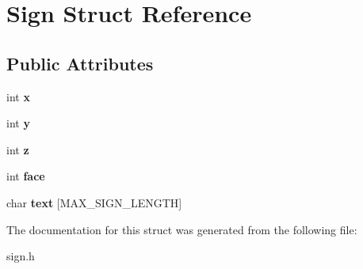 \hypertarget{structSign}{}\section{Sign Struct Reference}
\label{structSign}
\subsection*{Public Attributes}
\begin{DoxyCompactItemize}
\item 
\mbox{\label{structSign_a9672fe58fa3a1d75c9511fe8259eb4e6}} 
int {\bfseries x}
\item 
\mbox{\label{structSign_afdd7a7b76acc62dfd45965caed37c3f3}} 
int {\bfseries y}
\item 
\mbox{\label{structSign_a5eb6412ecae2da81951ffdf073a994ed}} 
int {\bfseries z}
\item 
\mbox{\label{structSign_a5a5f53a409cd7ec36733fc80e6d25785}} 
int {\bfseries face}
\item 
\mbox{\label{structSign_aa3053ca28e2fecc26cfbef7797da4646}} 
char {\bfseries text} \mbox{[}M\+A\+X\+\_\+\+S\+I\+G\+N\+\_\+\+L\+E\+N\+G\+TH\mbox{]}
\end{DoxyCompactItemize}


The documentation for this struct was generated from the following file\+:\begin{DoxyCompactItemize}
\item 
sign.\+h\end{DoxyCompactItemize}
